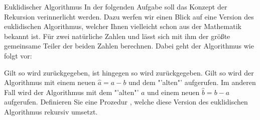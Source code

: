 \documentclass{../tuda-exercise}
\begin{document}
  \clearpagesolution

  \begin{task}[credit=\stars{1}{3}]{Euklidischer Algorithmus}
    In der folgenden Aufgabe soll das Konzept der Rekursion verinnerlicht werden. Dazu werfen wir
    einen Blick auf eine Version des euklidischen Algorithmus, welcher Ihnen vielleicht schon aus
    der Mathematik bekannt ist. Für zwei natürliche Zahlen  und 
    lässt sich mit ihm der größte gemeinsame Teiler der beiden Zahlen berechnen. Dabei geht der
    Algorithmus wie folgt vor:

    \br

    Gilt  so wird  zurückgegeben, ist hingegen
     so wird  zurückgegeben. Gilt  so wird
    der Algorithmus mit einem neuen \(\hat{a} = a - b\) und dem "'alten"'{} 
    aufgerufen. Im anderen Fall wird der Algorithmus mit dem "'alten"'{} \(a\) und einem neuen
    \(\hat{b} = b - a\) aufgerufen. Definieren Sie eine Prozedur ,
    welche diese Version des euklidischen Algorithmus rekursiv umsetzt.

    \begin{solution}
      
    \end{solution}
  \end{task}

  \clearpage
\end{document}

